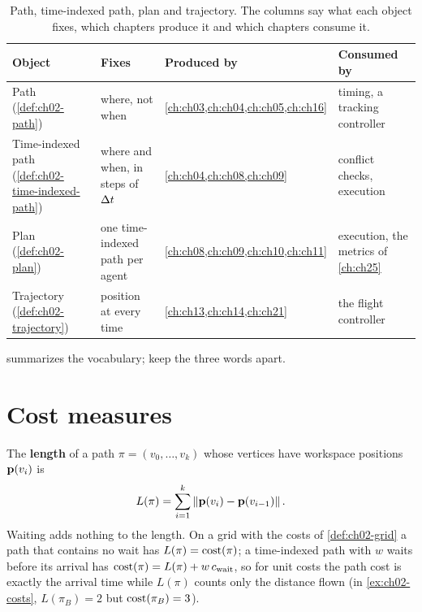 \begin{table}[tb]
\centering\small
\caption{Path, time-indexed path, plan and trajectory. The columns say what each object fixes, which chapters produce it and which chapters consume it.}
\label{tab:ch02-path-plan-trajectory}
\begin{tabularx}{\textwidth}{@{}lYlY@{}}
\toprule
Object & Fixes & Produced by & Consumed by\\
\midrule
Path (\cref{def:ch02-path}) & where, not when & \cref{ch:ch03,ch:ch04,ch:ch05,ch:ch16} & timing, a tracking controller\\
Time-indexed path (\cref{def:ch02-time-indexed-path}) & where and when, in steps of $\Delta t$ & \cref{ch:ch04,ch:ch08,ch:ch09} & conflict checks, execution\\
Plan (\cref{def:ch02-plan}) & one time-indexed path per agent & \cref{ch:ch08,ch:ch09,ch:ch10,ch:ch11} & execution, the metrics of \cref{ch:ch25}\\
Trajectory (\cref{def:ch02-trajectory}) & position at every time & \cref{ch:ch13,ch:ch14,ch:ch21} & the flight controller\\
\bottomrule
\end{tabularx}
\end{table}

 summarizes the vocabulary; keep the three words apart.

\section{Cost measures}
\label{sec:ch02-costs}

\begin{definition}
\label{def:ch02-path-length}
The \textbf{length} of a path $\pi=(v_0,\dots,v_k)$ whose vertices have workspace positions $\mathbf{p}(v_i)$ is
\begin{equation}
L(\pi)=\sum_{i=1}^{k}\left\lVert \mathbf{p}(v_i)-\mathbf{p}(v_{i-1}) \right\rVert.
\label{eq:ch02-path-length}
\end{equation}
Waiting adds nothing to the length. On a grid with the costs of \cref{def:ch02-grid} a path that contains no wait has $L(\pi)=\operatorname{cost}(\pi)$; a time-indexed path with $w$ waits before its arrival has $\operatorname{cost}(\pi)=L(\pi)+w\,c_{\text{wait}}$, so for unit costs the path cost is exactly the arrival time while $L(\pi)$ counts only the distance flown (in \cref{ex:ch02-costs}, $L(\pi_B)=2$ but $\operatorname{cost}(\pi_B)=3$).
\end{definition}

